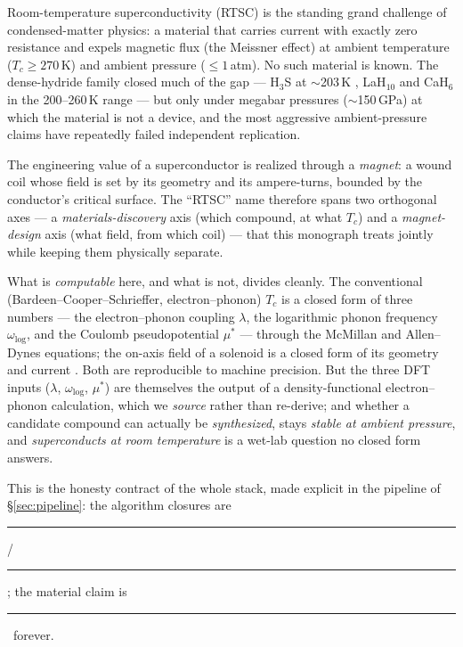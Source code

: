 \documentclass[11pt,a4paper]{article}
\newcommand{\tierdisc}[1]{\textcolor{#1}{\rule[0.05ex]{1.0ex}{1.0ex}}}
\newcommand{\tierBlue}{\tierdisc{blue!70!black}}
\newcommand{\tierGreen}{\tierdisc{green!60!black}}
\newcommand{\tierOrange}{\tierdisc{orange!90!black}}
\begin{document}
Room-temperature superconductivity (RTSC) is the standing grand
challenge of condensed-matter physics: a material that carries current
with exactly zero resistance and expels magnetic flux (the Meissner
effect) at ambient temperature ($T_c\!\ge\!270$\,K) and ambient
pressure ($\le\!1$\,atm). No such material is known. The dense-hydride
family closed much of the gap --- H$_3$S at $\sim$203\,K
\citep{drozdov2015}, LaH$_{10}$ and CaH$_6$ in the 200--260\,K range
--- but only under megabar pressures ($\sim$150\,GPa) at which the
material is not a device, and the most aggressive ambient-pressure
claims have repeatedly failed independent replication.

The engineering value of a superconductor is realized through a
\emph{magnet}: a wound coil whose field is set by its geometry and its
ampere-turns, bounded by the conductor's critical surface. The
``RTSC'' name therefore spans two orthogonal axes --- a
\emph{materials-discovery} axis (which compound, at what $T_c$) and a
\emph{magnet-design} axis (what field, from which coil) --- that this
monograph treats jointly while keeping them physically separate.

What is \emph{computable} here, and what is not, divides cleanly. The
conventional (Bardeen--Cooper--Schrieffer, electron--phonon)
\citep{bcs1957} $T_c$ is a closed form of three numbers ---
the electron--phonon coupling $\lambda$, the logarithmic phonon
frequency $\omega_{\log}$, and the Coulomb pseudopotential $\mu^{*}$
--- through the McMillan \citep{mcmillan1968} and Allen--Dynes
\citep{allendynes1975} equations; the on-axis field of a solenoid is a
closed form of its geometry and current \citep{jackson1999}. Both are
reproducible to machine precision. But the three DFT inputs
($\lambda$, $\omega_{\log}$, $\mu^{*}$) are themselves the output of a
density-functional electron--phonon calculation, which we \emph{source}
rather than re-derive; and whether a candidate compound can actually be
\emph{synthesized}, stays \emph{stable at ambient pressure}, and
\emph{superconducts at room temperature} is a wet-lab question no
closed form answers.

This is the honesty contract of the whole stack, made explicit in the
pipeline of \S\ref{sec:pipeline}: the algorithm closures are
\tierBlue/\tierGreen; the material claim is \tierOrange\ forever.
\end{document}
